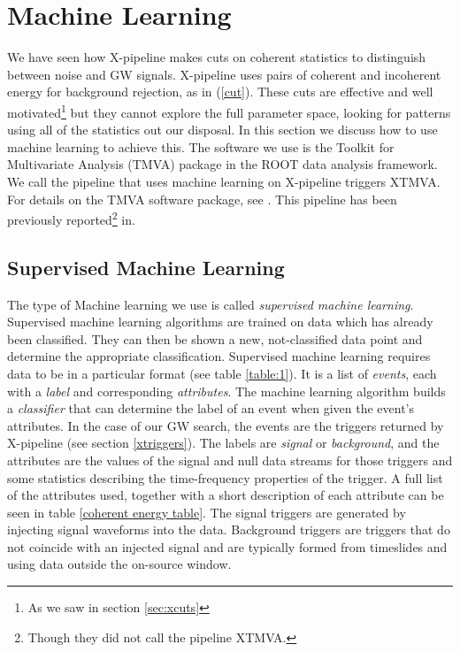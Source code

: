 \documentclass[11pt]{cuthesis}
\newcommand{\xp}{X-pipeline }
\begin{document}
\section{Machine Learning} \label{sec:ML}
We have seen how \xp makes cuts on coherent statistics to distinguish between noise and GW signals. \xp uses pairs of coherent and incoherent energy for background rejection, as in (\ref{cut}). These cuts are effective and well motivated\footnote{As we saw in section \ref{sec:xcuts}} but they cannot explore the full parameter space, looking for patterns using all of the statistics out our disposal. In this section we discuss how to use machine learning to achieve this. The software we use is the Toolkit for Multivariate Analysis (TMVA) package in the ROOT data analysis framework. We call the pipeline that uses machine learning on \xp triggers XTMVA. For details on the TMVA software package, see \cite{tmva_guide}. This pipeline has been previously reported\footnote{Though they did not call the pipeline XTMVA.} in. \cite{adams_mva}

\subsection{Supervised Machine Learning}
The type of Machine learning we use is called \textit{supervised machine learning}. Supervised machine learning algorithms are trained on data which has already been classified. They can then be shown a new, not-classified data point and determine the appropriate classification. Supervised machine learning requires data to be in a particular format (see table \ref{table:1}). It is a list of \emph{events}, each with a \emph{label} and corresponding \emph{attributes}. The machine learning algorithm builds a \textit{classifier} that can determine the label of an event when given the event's attributes. In the case of our GW search, the events are the triggers returned by \xp (see section \ref{xtriggers}). The labels are \textit{signal} or \textit{background}, and the attributes are the values of the signal and null data streams for those triggers and some statistics describing the time-frequency properties of the trigger. A full list of the attributes used, together with a short description of each attribute can be seen in table \ref{coherent energy table}. The signal triggers are generated by injecting signal waveforms into the data. Background triggers are triggers that do not coincide with an injected signal and are typically formed from timeslides and using data outside the on-source window.
\end{document}
